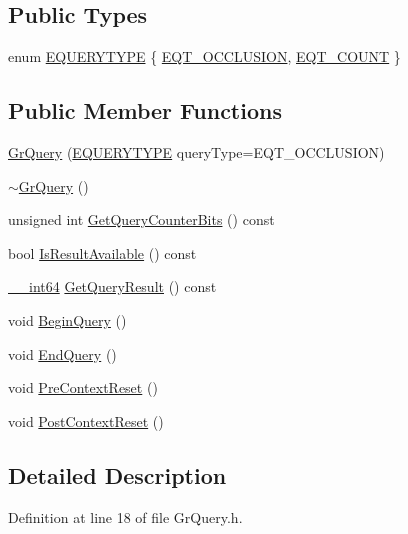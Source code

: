 \subsection*{Public Types}
\begin{CompactItemize}
\item 
enum \hyperlink{class_gr_query_932c1c9ceff8018b6f8420f282c2c38f}{EQUERYTYPE} \{ \hyperlink{class_gr_query_932c1c9ceff8018b6f8420f282c2c38fdefde3fbd36578dd412eadf2f0445e98}{EQT\_\-OCCLUSION}, 
\hyperlink{class_gr_query_932c1c9ceff8018b6f8420f282c2c38f039eb3383e627e36b40a6d1f9ef00ef4}{EQT\_\-COUNT}
 \}
\subsection*{Public Member Functions}
\begin{CompactItemize}
\item 
\hyperlink{class_gr_query_c0df4dcb95862062ebd6f79709cfaf61}{GrQuery} (\hyperlink{class_gr_query_932c1c9ceff8018b6f8420f282c2c38f}{EQUERYTYPE} queryType=EQT\_\-OCCLUSION)
\item 
\hyperlink{class_gr_query_cc96abe379dae515788dd66506a897d1}{$\sim$GrQuery} ()
\item 
unsigned int \hyperlink{class_gr_query_3534d970e30de6d5d9ea54d0d9e277d6}{GetQueryCounterBits} () const 
\item 
bool \hyperlink{class_gr_query_d73868c0e8a060755b675c68b940dbff}{IsResultAvailable} () const 
\item 
\hyperlink{common__afx_8h_2e015c96ada30f1fdb9322f7af889c10}{\_\-\_\-int64} \hyperlink{class_gr_query_3b028c5e929962cce0bafa5d0b95004c}{GetQueryResult} () const 
\item 
void \hyperlink{class_gr_query_2fed8cc1e8806f6ae422592978abc282}{BeginQuery} ()
\item 
void \hyperlink{class_gr_query_d228edca708b8ed86a27d3bc165b4e72}{EndQuery} ()
\item 
void \hyperlink{class_gr_query_7eede116866c6a843bba5ecf04240ec0}{PreContextReset} ()
\item 
void \hyperlink{class_gr_query_d7acbab0c865e8974de365fa6610f43e}{PostContextReset} ()
\end{CompactItemize}


\subsection{Detailed Description}


Definition at line 18 of file GrQuery.h.


\end{CompactItemize}
